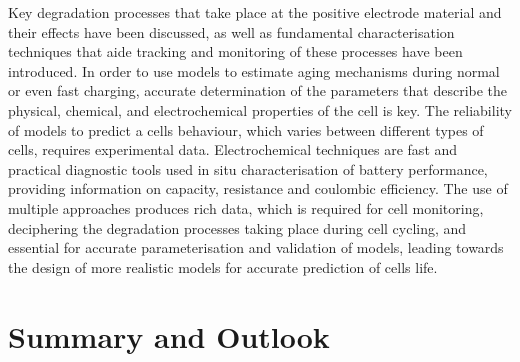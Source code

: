 \documentclass[journal=jacsat,manuscript=article]{achemso}
\begin{document}
Key degradation processes that take place at the positive electrode material and their effects have been discussed, as well as fundamental characterisation techniques that aide tracking and monitoring of these processes have been introduced. In order to use models to estimate aging mechanisms during normal or even fast charging, accurate determination of the parameters that describe the physical, chemical, and electrochemical properties of the cell is key. The reliability of models to predict a cells behaviour, which varies between different types of cells, requires experimental data. Electrochemical techniques are fast and practical diagnostic tools used in situ characterisation of battery performance, providing information on capacity, resistance and coulombic efficiency. The use of multiple approaches produces rich data, which is required for cell monitoring, deciphering the degradation processes taking place during cell cycling, and essential for accurate parameterisation and validation of models, leading towards the design of more realistic models for accurate prediction of cells life.

\section*{Summary and Outlook}
\end{document}
